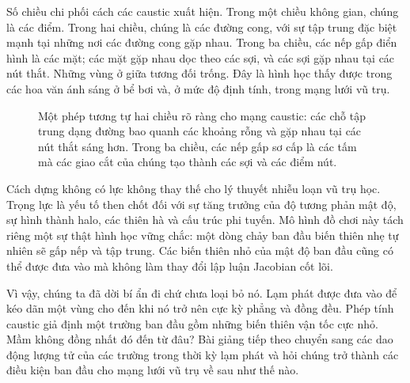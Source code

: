 Số chiều chi phối cách các caustic xuất hiện. Trong một chiều không gian, chúng là các điểm. Trong hai chiều, chúng là các đường cong, với sự tập trung đặc biệt mạnh tại những nơi các đường cong gặp nhau. Trong ba chiều, các nếp gấp điển hình là các mặt; các mặt gặp nhau dọc theo các sợi, và các sợi gặp nhau tại các nút thắt. Những vùng ở giữa tương đối trống. Đây là hình học thấy được trong các hoa văn ánh sáng ở bể bơi và, ở mức độ định tính, trong mạng lưới vũ trụ.

\begin{figure}[htbp]
\centering
{}
\caption{Một phép tương tự hai chiều rõ ràng cho mạng caustic: các chỗ tập trung dạng đường bao quanh các khoảng rỗng và gặp nhau tại các nút thắt sáng hơn. Trong ba chiều, các nếp gấp sơ cấp là các tấm mà các giao cắt của chúng tạo thành các sợi và các điểm nút.}
\label{fig:c09-caustic-network}
\end{figure}

Cách dựng không có lực không thay thế cho lý thuyết nhiễu loạn vũ trụ học. Trọng lực là yếu tố then chốt đối với sự tăng trưởng của độ tương phản mật độ, sự hình thành halo, các thiên hà và cấu trúc phi tuyến. Mô hình đồ chơi này tách riêng một sự thật hình học vững chắc: một dòng chảy ban đầu biến thiên nhẹ tự nhiên sẽ gấp nếp và tập trung. Các biến thiên nhỏ của mật độ ban đầu cũng có thể được đưa vào mà không làm thay đổi lập luận Jacobian cốt lõi.

Vì vậy, chúng ta đã dời bí ẩn đi chứ chưa loại bỏ nó. Lạm phát được đưa vào để kéo dãn một vùng cho đến khi nó trở nên cực kỳ phẳng và đồng đều. Phép tính caustic giả định một trường ban đầu gồm những biến thiên vận tốc cực nhỏ. Mầm không đồng nhất đó đến từ đâu? Bài giảng tiếp theo chuyển sang các dao động lượng tử của các trường trong thời kỳ lạm phát và hỏi chúng trở thành các điều kiện ban đầu cho mạng lưới vũ trụ về sau như thế nào.

